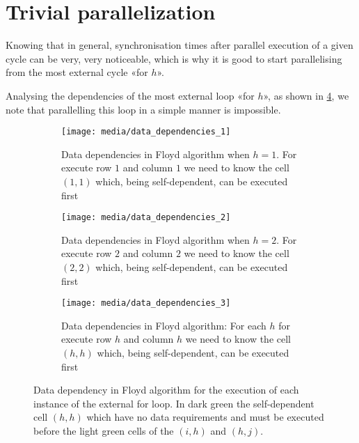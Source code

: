 \section{Trivial parallelization}\label{trivial_parallelization}

Knowing that in general, synchronisation times after parallel execution of a given cycle can be very, very noticeable, which is why it is good to start parallelising from the most external cycle «for \(h\)».

Analysing the dependencies of the most external loop «for \(h\)», as shown in \cref{fig:data-dependency-external-loop}, we note that parallelling this loop in a simple manner is impossible.

\begin{figure}
    \centering
    \begin{subfigure}[t]{0.3\textwidth}
        \centering
        \texttt{[image: media/data\_dependencies\_1]}
        \caption{Data dependencies in Floyd algorithm when \(h=1\). For execute row \(1\) and column \(1\) we need to know the cell \((1,1)\) which, being self-dependent, can be executed first}
        \label{fig:data-dependencies-1}
    \end{subfigure}
    \hfill
    \begin{subfigure}[t]{0.3\textwidth}
        \centering
        \texttt{[image: media/data\_dependencies\_2]}
        \caption{Data dependencies in Floyd algorithm when \(h=2\). For execute row \(2\) and column \(2\) we need to know the cell \((2,2)\) which, being self-dependent, can be executed first}
        \label{fig:data-dependencies-2}
    \end{subfigure}
    \hfill
    \begin{subfigure}[t]{0.3\textwidth}
        \centering
        \texttt{[image: media/data\_dependencies\_3]}
        \caption{Data dependencies in Floyd algorithm: For each \(h\) for execute row \(h\) and column \(h\) we need to know the cell \((h,h)\) which, being self-dependent, can be executed first}
        \label{fig:data-dependencies-3}
    \end{subfigure}
    \caption{Data dependency in Floyd algorithm for the execution of each instance of the external for loop. In dark green the self-dependent cell \((h,h)\) which have no data requirements and must be  executed before the light green cells of the \((i,h)\) and \((h,j)\).}
    \label{fig:data-dependency-external-loop}
\end{figure}

